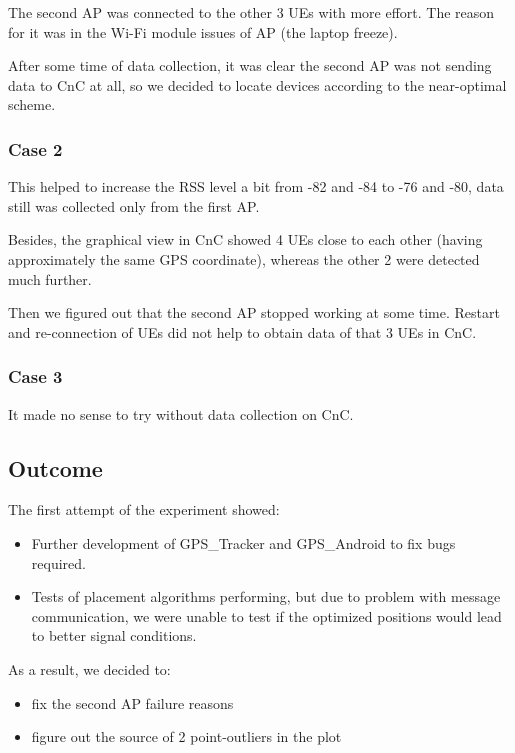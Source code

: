 The second AP was connected to the other 3 UEs with more effort. The reason for it was in the Wi-Fi module issues of AP  (the laptop freeze).

After some time of data collection, it was clear the second AP was not sending data to CnC at all, so we decided to locate devices according to the near-optimal scheme.

\hypertarget{case-2}{%
\subsubsection{Case 2}\label{case-2}}

This helped to increase the RSS level a bit from -82 and -84 to -76 and
-80, data still was collected only from the first AP.

Besides, the graphical view in CnC showed 4 UEs close to each other (having approximately the same GPS coordinate), whereas the other 2 were detected much further.

Then we figured out that the second AP stopped working at some time. Restart and re-connection of UEs did not help to obtain data of that 3 UEs in CnC.

\hypertarget{case-3}{%
\subsubsection{Case 3}\label{case-3}}

It made no sense to try without data collection on CnC.

\hypertarget{outcome}{%
\subsection{Outcome}\label{outcome}}

The first attempt of the experiment showed:

\begin{itemize}
\tightlist
\item
  Further development of GPS\_Tracker and GPS\_Android to fix bugs required.
\item
  Tests of placement algorithms performing, but due to problem with message communication, we were unable to test if the optimized positions would lead to better signal conditions.
\end{itemize}

As a result, we decided to:

\begin{itemize}
\tightlist
\item
  fix the second AP failure reasons
\item
  figure out the source of 2 point-outliers in the plot
\end{itemize}
